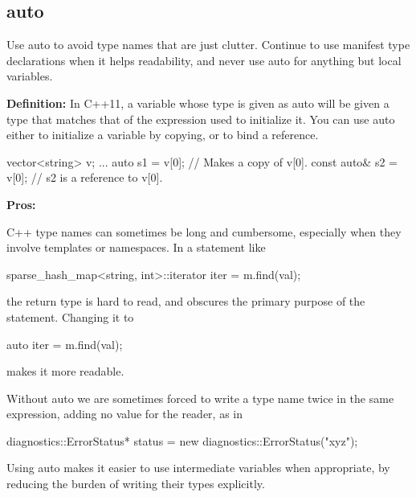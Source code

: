 \subsection*{auto}

Use {\ttfamily auto} to avoid type names that are just clutter. Continue to use manifest type declarations when it helps readability, and never use {\ttfamily auto} for anything but local variables.

{\bfseries Definition\+:} In C++11, a variable whose type is given as {\ttfamily auto} will be given a type that matches that of the expression used to initialize it. You can use {\ttfamily auto} either to initialize a variable by copying, or to bind a reference.


\begin{DoxyCode}
vector<string> v;
...
auto s1 = v[0];  \textcolor{comment}{// Makes a copy of v[0].}
\textcolor{keyword}{const} \textcolor{keyword}{auto}& s2 = v[0];  \textcolor{comment}{// s2 is a reference to v[0].}
\end{DoxyCode}


{\bfseries Pros\+:}

C++ type names can sometimes be long and cumbersome, especially when they involve templates or namespaces. In a statement like


\begin{DoxyCode}
sparse\_hash\_map<string, int>::iterator iter = m.find(val);
\end{DoxyCode}


the return type is hard to read, and obscures the primary purpose of the statement. Changing it to


\begin{DoxyCode}
\textcolor{keyword}{auto} iter = m.find(val);
\end{DoxyCode}


makes it more readable.

Without {\ttfamily auto} we are sometimes forced to write a type name twice in the same expression, adding no value for the reader, as in


\begin{DoxyCode}
diagnostics::ErrorStatus* status = \textcolor{keyword}{new} diagnostics::ErrorStatus(\textcolor{stringliteral}{"xyz"});
\end{DoxyCode}


Using {\ttfamily auto} makes it easier to use intermediate variables when appropriate, by reducing the burden of writing their types explicitly.

